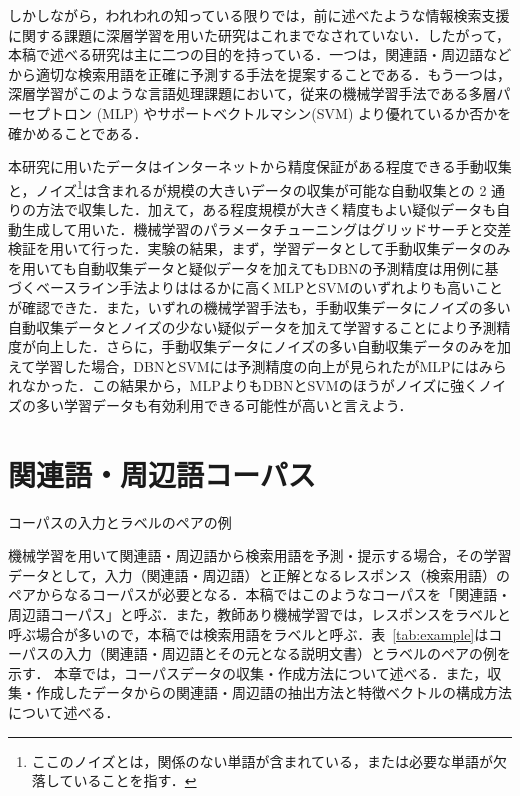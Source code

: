 \documentclass[japanese]{jnlp_1.4}
\begin{document}
しかしながら，われわれの知っている限りでは，前に述べたような情報検索支援に関する課題に深層学習を用いた研究はこれまでなされていない．したがって，本稿で述べる研究は主に二つの目的を持っている．一つは，関連語・周辺語などから適切な検索用語を正確に予測する手法を提案することである．もう一つは，深層学習がこのような言語処理課題において，従来の機械学習手法である多層パーセプトロン (MLP) やサポートベクトルマシン(SVM) より優れているか否かを確かめることである．

本研究に用いたデータはインターネットから精度保証がある程度できる手動収集と，ノイズ\footnote{ここのノイズとは，関係のない単語が含まれている，または必要な単語が欠落していることを指す．}は含まれるが規模の大きいデータの収集が可能な自動収集との 2 通りの方法で収集した．加えて，ある程度規模が大きく精度もよい疑似データも自動生成して用いた．機械学習のパラメータチューニングはグリッドサーチと交差検証を用いて行った．実験の結果，まず，学習データとして手動収集データのみを用いても自動収集データと疑似データを加えてもDBNの予測精度は用例に基づくベースライン手法よりははるかに高くMLPとSVMのいずれよりも高いことが確認できた．また，いずれの機械学習手法も，手動収集データにノイズの多い自動収集データとノイズの少ない疑似データを加えて学習することにより予測精度が向上した．さらに，手動収集データにノイズの多い自動収集データのみを加えて学習した場合，DBNとSVMには予測精度の向上が見られたがMLPにはみられなかった．この結果から，MLPよりもDBNとSVMのほうがノイズに強くノイズの多い学習データも有効利用できる可能性が高いと言えよう．


\section{関連語・周辺語コーパス}

\begin{table}[b]
\caption{コーパスの入力とラベルのペアの例}
\label{tab:example}

\end{table}

機械学習を用いて関連語・周辺語から検索用語を予測・提示する場合，その学習データとして，入力（関連語・周辺語）と正解となるレスポンス（検索用語）のペアからなるコーパスが必要となる．本稿ではこのようなコーパスを「関連語・周辺語コーパス」と呼ぶ．また，教師あり機械学習では，レスポンスをラベルと呼ぶ場合が多いので，本稿では検索用語をラベルと呼ぶ．表~\ref{tab:example}はコーパスの入力（関連語・周辺語とその元となる説明文書）とラベルのペアの例を示す．
本章では，コーパスデータの収集・作成方法について述べる．また，収集・作成したデータからの関連語・周辺語の抽出方法と特徴ベクトルの構成方法について述べる．
\end{document}
